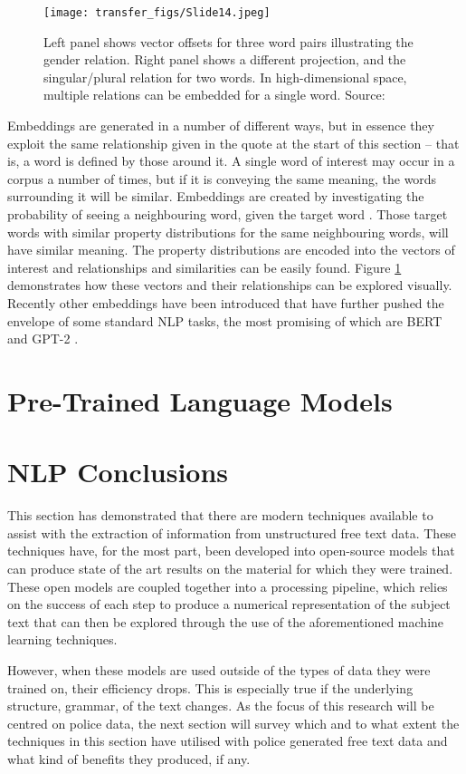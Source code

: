 \begin{figure}
  \texttt{[image: transfer\_figs/Slide14.jpeg]}
  \caption[Word Embeddings visual example]{Left panel shows vector offsets for three word pairs illustrating the gender relation. Right panel shows a different projection, and the singular/plural relation for two words. In high-dimensional space, multiple relations can be embedded for a single word. Source: \textcite{mikolov2013linguistic}}
  \label{fig:word}
\end{figure}

Embeddings are generated in a number of different ways, but in essence they exploit the same relationship given in the quote at the start of this section – that is, a word is defined by those around it. A single word of interest may occur in a corpus a number of times, but if it is conveying the same meaning, the words surrounding it will be similar. Embeddings are created by investigating the probability of seeing a neighbouring word, given the target word  \parencite{mikolov2013efficient}. Those target words with similar property distributions for the same neighbouring words, will have similar meaning. The property distributions are encoded into the vectors of interest and relationships and similarities can be easily found. Figure \ref{fig:word} demonstrates how these vectors and their relationships can be explored visually. Recently other embeddings have been introduced that have further pushed the envelope of some standard NLP tasks, the most promising of which are BERT \parencite{devlin2018bert} and GPT-2 \parencite{radford2019language}.


\section{Pre-Trained Language Models}


\section{ NLP Conclusions} This section has demonstrated that there are modern techniques available to assist with the extraction of information from unstructured free text data. These techniques have, for the most part, been developed into open-source models that can produce state of the art results on the material for which they were trained. These open models are coupled together into a processing pipeline, which relies on the success of each step to produce a numerical representation of the subject text that can then be explored through the use of the aforementioned machine learning techniques.

However, when these models are used outside of the types of data they were trained on, their efficiency drops. This is especially true if the underlying structure, grammar, of the text changes. As the focus of this research will be centred on police data, the next section will survey which and to what extent the techniques in this section have utilised with police generated free text data and what kind of benefits they produced, if any.

